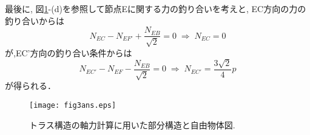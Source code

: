 \documentclass[10pt,a4j]{jarticle}
\begin{document}
最後に, 図\ref{fig:fig3}-(d)を参照して節点Eに関する力の釣り合いを考えと,
EC方向の力の釣り合いからは
\begin{equation}
	N_{EC}-N_{EF'}+\frac{N_{EB}}{\sqrt{2}}=0
	\; \Rightarrow \; N_{EC}=0
\end{equation}
が,EC'方向の釣り合い条件からは
\begin{equation}
	N_{EC'}-N_{EF}-\frac{N_{EB}}{\sqrt{2}}=0
	\; \Rightarrow \;
	N_{EC'}=\frac{3\sqrt{2}}{4}p
\end{equation}
が得られる．
\begin{figure}[h]
	\begin{center}
	\texttt{[image: fig3ans.eps]} 
	\end{center}
	\caption{トラス構造の軸力計算に用いた部分構造と自由物体図.} 
	\label{fig:fig3}
\end{figure}
\end{document}
